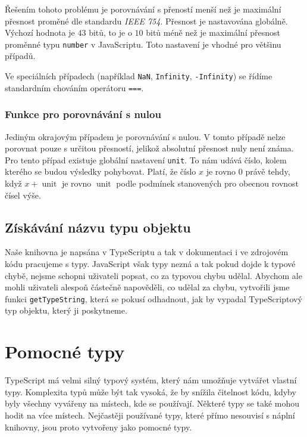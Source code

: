 Řešením tohoto problému je porovnávání s přeností menší než je maximální přesnost proměné dle standardu \textit{IEEE 754}. 
Přesnost je nastavována globálně.
Výchozí hodnota je $43$ bitů, to je o $10$ bitů méně než je maximální přesnost proměnné typu \texttt{number} v JavaScriptu.
Toto nastavení je vhodné pro většinu případů.

Ve speciálních případech (například \texttt{NaN}, \texttt{Infinity}, \texttt{-Infinity}) se řídíme standardním chováním operátoru \texttt{===}.\cite{geometryjs:wiki:helpers}

\subsubsection[Rovnost nule]{Funkce pro porovnávání s nulou}
\label{subsubsec:helper-function-compare-to-zero}

Jediným okrajovým případem je porovnávání s nulou.
V tomto případě nelze porovnat pouze s určitou přesností, jelikož absolutní přesnost nuly není známa.
Pro tento případ existuje globální nastavení \texttt{unit}. 
To nám udává číslo, kolem kterého se budou výsledky pohybovat. 
Platí, že číslo $x$ je rovno 0 právě tehdy, když $x + \mathop{unit}$ je rovno $\mathop{unit}$ podle podmínek stanovených pro obecnou rovnost čísel výše.\cite{geometryjs:source:interfaces:float.ts}

\subsection[Název typu]{Získávání názvu typu objektu}
\label{subsec:getting-type-name}

Naše knihovna je napsána v TypeScriptu a tak v dokumentaci i ve zdrojovém kódu pracujeme s typy.
JavaScript však typy nezná\cite{mdn:object-type} a tak pokud dojde k typové chybě, nejsme schopni uživateli popsat, co za typovou chybu udělal.
Abychom ale mohli uživateli alespoň částečně napověděli, co udělal za chybu, vytvořili jsme funkci \texttt{getTypeString}\cite{geometryjs:source:helpers:getTypeString.ts}, která se pokusí odhadnout, jak by vypadal TypeScriptový typ objektu, který ji poskytneme.

\section{Pomocné typy}
\label{sec:helper-types}

TypeScript má velmi silný typový systém, který nám umožňuje vytvářet vlastní typy.
Komplexita typů může být tak vysoká, že by snížila čitelnost kódu, kdyby byly všechny vyvářeny na místech, kde se používají.
Některé typy se také mohou hodit na více místech.
Nejčastěji používané typy, které přímo nesouvisí s náplní knihovny, jsou proto vytvořeny jako pomocné typy.


